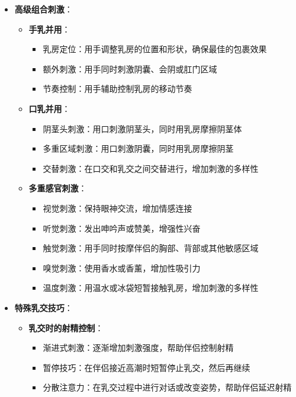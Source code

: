 \documentclass[12pt,UTF8]{ctexbook}
\begin{document}
\begin{itemize}
\begin{itemize}
\begin{itemize}
			\item 乳头挤压：挤压乳头使其变硬，然后用变硬的乳头刺激阴茎敏感区域
		\end{itemize}
	\end{itemize}
	\item \textbf{高级组合刺激}：
	\begin{itemize}
		\item \textbf{手乳并用}：
		\begin{itemize}
			\item 乳房定位：用手调整乳房的位置和形状，确保最佳的包裹效果
			\item 额外刺激：用手同时刺激阴囊、会阴或肛门区域
			\item 节奏控制：用手辅助控制乳房的移动节奏
		\end{itemize}
		\item \textbf{口乳并用}：
		\begin{itemize}
			\item 阴茎头刺激：用口刺激阴茎头，同时用乳房摩擦阴茎体
			\item 多重区域刺激：用口刺激阴囊，同时用乳房摩擦阴茎
			\item 交替刺激：在口交和乳交之间交替进行，增加刺激的多样性
		\end{itemize}
		\item \textbf{多重感官刺激}：
		\begin{itemize}
			\item 视觉刺激：保持眼神交流，增加情感连接
			\item 听觉刺激：发出呻吟声或赞美，增强性兴奋
			\item 触觉刺激：用手同时按摩伴侣的胸部、背部或其他敏感区域
			\item 嗅觉刺激：使用香水或香薰，增加性吸引力
			\item 温度刺激：用温水或冰袋短暂接触乳房，增加刺激的多样性
		\end{itemize}
	\end{itemize}
	\item \textbf{特殊乳交技巧}：
	\begin{itemize}
		\item \textbf{乳交时的射精控制}：
		\begin{itemize}
			\item 渐进式刺激：逐渐增加刺激强度，帮助伴侣控制射精
			\item 暂停技巧：在伴侣接近高潮时短暂停止乳交，然后再继续
			\item 分散注意力：在乳交过程中进行对话或改变姿势，帮助伴侣延迟射精
		\end{itemize}

\end{itemize}
\end{itemize}
\end{document}

